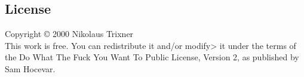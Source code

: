 \documentclass[a4paper]{book}
\begin{document}
    \begin{appendices}
        
        
        

        \chapter{License}\label{chapter:license}
        Copyright © 2000 Nikolaus Trixner\\
        This work is free.
        You can redistribute it and/or modify> it under the terms of the Do What The Fuck You Want To Public License, Version 2, as published by Sam Hocevar.
    \end{appendices}
\end{document}
